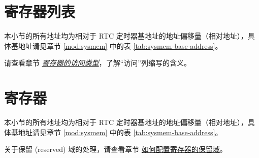 \documentclass[main\_\_CN.tex]{subfiles}
\begin{document}

\newpage
\hypertarget{rtctimer-reg-summ}{}
\section{寄存器列表}
\label{sec:rtctimer-reg-summ}

本小节的所有地址均为相对于 RTC 定时器基地址的地址偏移量（相对地址），具体基地址请见章节 \ref{mod:sysmem} \textit{} 中的表 \ref{tab:sysmem-base-address}。

请查看章节 \hyperref[glossary-access-types]{\textit{寄存器的访问类型}}，了解“访问”列缩写的含义。





\newpage
\section{寄存器}

本小节的所有地址均为相对于 RTC 定时器基地址的地址偏移量（相对地址），具体基地址请见章节 \ref{mod:sysmem} \textit{} 中的表 \ref{tab:sysmem-base-address}。

关于保留 (reserved) 域的处理，请查看章节 \hyperref[programming-reserved-field]{如何配置寄存器的保留域}。



\end{document}
